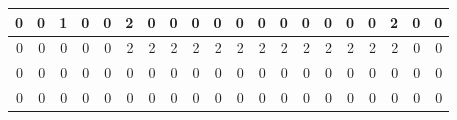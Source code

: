 \documentclass[a4paper]{article}
\begin{document}
\begin{table}[h]
\begin{tabular}{|r|r|r|r|r|r|r|r|r|r|r|r|r|r|r|r|r|r|r|r|}
		\hline
		0     & 0     & 1     & 0     & 0     & 2     & 0     & 0     & 0     & 0     & 0     & 0     & 0     & 0     & 0     & 0     & 0     & 2     & 0     & 0 \bigstrut\\
		\hline
		0     & 0     & 0     & 0     & 0     & 2     & 2     & 2     & 2     & 2     & 2     & 2     & 2     & 2     & 2     & 2     & 2     & 2     & 0     & 0 \bigstrut\\
		\hline
		0     & 0     & 0     & 0     & 0     & 0     & 0     & 0     & 0     & 0     & 0     & 0     & 0     & 0     & 0     & 0     & 0     & 0     & 0     & 0 \bigstrut\\
		\hline
		0     & 0     & 0     & 0     & 0     & 0     & 0     & 0     & 0     & 0     & 0     & 0     & 0     & 0     & 0     & 0     & 0     & 0     & 0     & 0 \bigstrut\\
		\hline
	\end{tabular}%
	\label{table: Hw2-2A connected}%
\end{table}%
\end{document}
